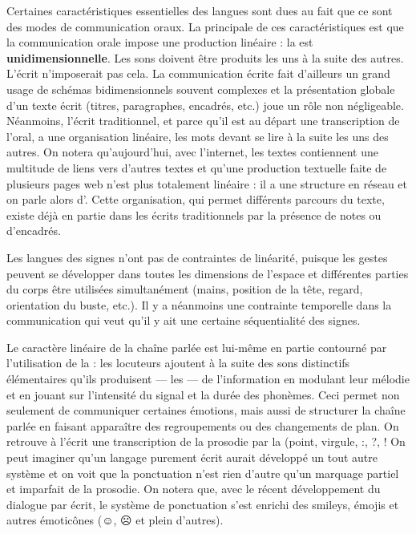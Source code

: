 Certaines caractéristiques essentielles des langues sont dues au fait que ce sont des modes de communication oraux. La principale de ces caractéristiques est que la communication orale impose une production linéaire : la  est \textbf{unidimensionnelle}. Les sons doivent être produits les uns à la suite des autres. L’écrit n’imposerait pas cela. La communication écrite fait d’ailleurs un grand usage de schémas bidimensionnels souvent complexes et la présentation globale d’un texte écrit (titres, paragraphes, encadrés, etc.) joue un rôle non négligeable. Néanmoins, l’écrit traditionnel, et parce qu’il est au départ une transcription de l’oral, a une organisation linéaire, les mots devant se lire à la suite les uns des autres. On notera qu’aujourd’hui, avec l’internet, les textes contiennent une multitude de liens vers d’autres textes et qu’une production textuelle faite de plusieurs pages web n’est plus totalement linéaire : il a une structure en réseau et on parle alors d’. Cette organisation, qui permet différents parcours du texte, existe déjà en partie dans les écrits traditionnels par la présence de notes ou d’encadrés.

Les langues des signes n’ont pas de contraintes de linéarité, puisque les gestes peuvent se développer dans toutes les dimensions de l’espace et différentes parties du corps être utilisées simultanément (mains, position de la tête, regard, orientation du buste, etc.). Il y a néanmoins une contrainte temporelle dans la communication qui veut qu’il y ait une certaine séquentialité des signes.

Le caractère linéaire de la chaîne parlée est lui-même en partie contourné par l’utilisation de la : les locuteurs ajoutent à la suite des sons distinctifs élémentaires qu’ils produisent — les  — de l’information en modulant leur mélodie et en jouant sur l’intensité du signal et la durée des phonèmes. Ceci permet non seulement de communiquer certaines émotions, mais aussi de structurer la chaîne parlée en faisant apparaître des regroupements ou des changements de plan. On retrouve à l’écrit une transcription de la prosodie par la  (point, virgule, :, ?, !  On peut imaginer qu’un langage purement écrit aurait développé un tout autre système et on voit que la ponctuation n’est rien d’autre qu’un marquage partiel et imparfait de la prosodie. On notera que, avec le récent développement du dialogue par écrit, le système de ponctuation s’est enrichi des smileys, émojis et autres émoticônes (☺, ☹ et plein d’autres).

